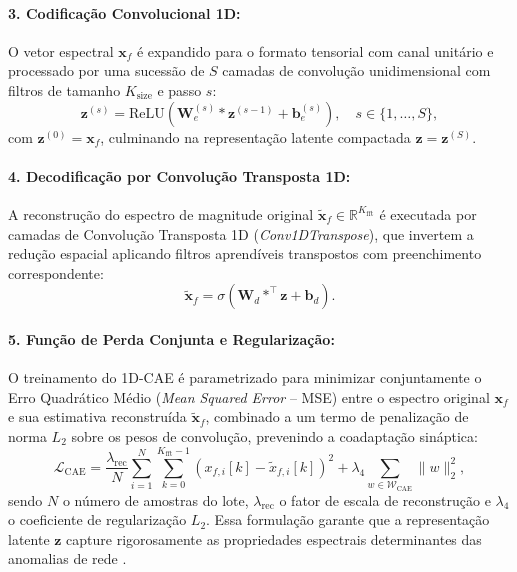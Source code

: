 \paragraph{3. Codificação Convolucional 1D:}
O vetor espectral $\mathbf{x}_f$ é expandido para o formato tensorial com canal unitário e processado por uma sucessão de $S$ camadas de convolução unidimensional com filtros de tamanho $K_{\mathrm{size}}$ e passo $s$:
\begin{equation}
\label{eq:cae_enc_step}
\mathbf{z}^{(s)} = \mathrm{ReLU} \left( \mathbf{W}_e^{(s)} * \mathbf{z}^{(s-1)} + \mathbf{b}_e^{(s)} \right), \quad s \in \{1, \dots, S\},
\end{equation}
com $\mathbf{z}^{(0)} = \mathbf{x}_f$, culminando na representação latente compactada $\mathbf{z} = \mathbf{z}^{(S)}$.

\paragraph{4. Decodificação por Convolução Transposta 1D:}
A reconstrução do espectro de magnitude original $\tilde{\mathbf{x}}_f \in \mathbb{R}^{K_{\mathrm{fft}}}$ é executada por camadas de Convolução Transposta 1D (\emph{Conv1DTranspose}), que invertem a redução espacial aplicando filtros aprendíveis transpostos com preenchimento correspondente:
\begin{equation}
\label{eq:cae_dec_step}
\tilde{\mathbf{x}}_f = \sigma \left( \mathbf{W}_d *^{\top} \mathbf{z} + \mathbf{b}_d \right).
\end{equation}

\paragraph{5. Função de Perda Conjunta e Regularização:}
O treinamento do 1D-CAE é parametrizado para minimizar conjuntamente o Erro Quadrático Médio (\emph{Mean Squared Error} -- MSE) entre o espectro original $\mathbf{x}_f$ e sua estimativa reconstruída $\tilde{\mathbf{x}}_f$, combinado a um termo de penalização de norma $L_2$ sobre os pesos de convolução, prevenindo a coadaptação sináptica:
\begin{equation}
\label{eq:cae_loss_total}
\mathcal{L}_{\mathrm{CAE}} = \frac{\lambda_{\mathrm{rec}}}{N} \sum_{i=1}^N \sum_{k=0}^{K_{\mathrm{fft}}-1} \left( x_{f, i}[k] - \tilde{x}_{f, i}[k] \right)^2 + \lambda_4 \sum_{w \in \mathcal{W}_{\mathrm{CAE}}} \|w\|_2^2,
\end{equation}
sendo $N$ o número de amostras do lote, $\lambda_{\mathrm{rec}}$ o fator de escala de reconstrução e $\lambda_4$ o coeficiente de regularização $L_2$. Essa formulação garante que a representação latente $\mathbf{z}$ capture rigorosamente as propriedades espectrais determinantes das anomalias de rede \cite{borgioli2024cae}.


